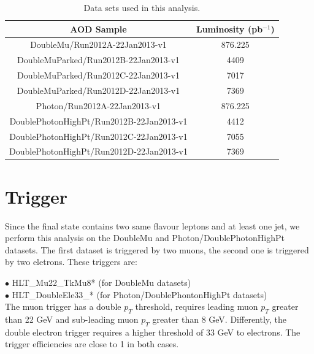 \begin{center}
  \begin{table}[h]
    \begin{center}
      \begin{tabular}{|c|c|}
        \hline
        AOD Sample & Luminosity (pb$^{-1}$) \\ \hline
        DoubleMu/Run2012A-22Jan2013-v1 & 876.225 \\ \hline
        DoubleMuParked/Run2012B-22Jan2013-v1 & 4409 \\ \hline
        DoubleMuParked/Run2012C-22Jan2013-v1 & 7017 \\ \hline
        DoubleMuParked/Run2012D-22Jan2013-v1 & 7369 \\ \hline
        Photon/Run2012A-22Jan2013-v1 &  876.225 \\ \hline
        DoublePhotonHighPt/Run2012B-22Jan2013-v1 & 4412 \\ \hline
        DoublePhotonHighPt/Run2012C-22Jan2013-v1 & 7055 \\ \hline
        DoublePhotonHighPt/Run2012D-22Jan2013-v1 & 7369 \\
        \hline
      \end{tabular}
    \end{center}
    \caption{\label{tab:TabDataSet}Data sets used in this analysis.}    
  \end{table}
\end{center}

\section{Trigger}
Since the final state contains two same flavour leptons and at least one jet, we perform this analysis on the DoubleMu and Photon/DoublePhotonHighPt datasets. The first dataset is triggered by two muons, the second one is triggered by two eletrons. These triggers are:
\newline

\noindent
$\bullet$ HLT\_Mu22\_TkMu8* (for DoubleMu datasets)\\
$\bullet$ HLT\_DoubleEle33\_* (for Photon/DoublePhontonHighPt datasets)\\


\noindent
The muon trigger has a double $p_{T}$ threshold, requires leading muon $p_{T}$ greater than 22 GeV and sub-leading muon $p_{T}$ greater than 8 GeV. Differently, the double electron trigger requires a higher threshold of 33 GeV to electrons. The trigger efficiencies are close to 1 in both cases.


